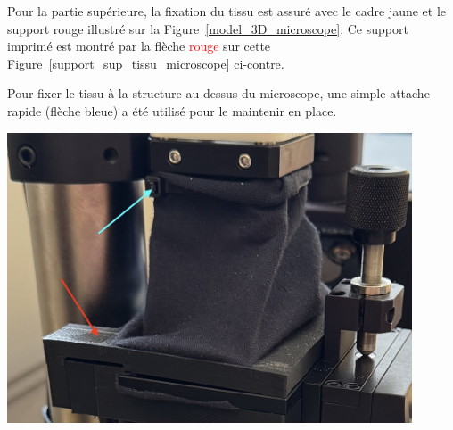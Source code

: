 \begin{minipage}[c]{0.48\textwidth}
    Pour la partie supérieure, la fixation du tissu est assuré avec le cadre \textcolor[RGB]{233, 173, 56}{jaune} et le support \textcolor[RGB]{170, 50, 50}{rouge} illustré sur la Figure~\ref{model_3D_microscope}. Ce support imprimé est montré par la flèche \textcolor{red}{rouge} sur cette Figure~\ref{support_sup_tissu_microscope} ci-contre.

    \vspace{1em}
    Pour fixer le tissu à la structure au-dessus du microscope, une simple attache rapide (flèche \textcolor[RGB]{115, 210, 210}{bleue}) a été utilisé pour le maintenir en place.

\end{minipage}\hfill
\begin{minipage}[c]{0.48\textwidth}
    \begin{center}
        \includegraphics[width=0.9\textwidth]{assets/figures/Protections_laser/Securite_mecanique/Protection_vers_microscope/support_sup_tissu_microscope.jpeg}
    \end{center}
    \label{support_sup_tissu_microscope}
\end{minipage}

